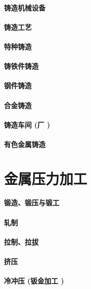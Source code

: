 \documentclass[UTF8]{../../ApplicationUniverse}
\begin{document}
\subsubsection{铸造机械设备}
\subsubsection{铸造工艺}
\subsubsection{特种铸造}
\subsubsection{铸铁件铸造}
\subsubsection{钢件铸造}
\subsubsection{合金铸造}
\subsubsection{铸造车间 (厂 )}
\subsubsection{有色金属铸造}






\chapter{金属压力加工}
\subsubsection{锻造、锻压与锻工}
\subsubsection{轧制}
\subsubsection{拉制、拉拔}
\subsubsection{挤压}
\subsubsection{冷冲压 (钣金加工 )}
\end{document}
